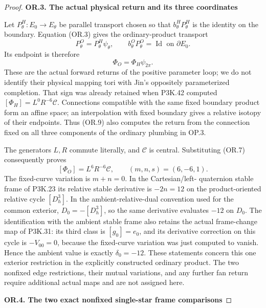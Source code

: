 \begin{proof}
\par

\medskip\noindent\textbf{OR.3. The actual physical return and its three coordinates}

\par\nobreak

Let \(P^H_\theta:E_0\to E_\theta\) be parallel transport chosen
so that \(b^H_\theta P^H_\theta\) is the identity on the boundary.
Equation (OR.3) gives the ordinary-product transport
\[
                       P^O_\theta=P^H_\theta\psi_\theta,
 \qquad b^O_\theta P^O_\theta=\operatorname{Id}
                       \text{ on }\partial E_0.      \tag{OR.8}
\]
Its endpoint is therefore
\[
                         \Phi_O=\Phi_H\psi_{2\pi}.   \tag{OR.9}
\]
These are the actual forward returns of the positive parameter loop;
we do not identify their physical mapping tori with Jin's oppositely
parameterized completion. That sign was already retained when
P3K.42 computed \([\Phi_H]=L^0R^{-6}\mathcal C\).
Connections compatible with the same fixed boundary product form
an affine space; an interpolation with fixed boundary gives a
relative isotopy of their endpoints. Thus (OR.9) also computes the
return from the connection fixed on all three components of the
ordinary plumbing in OP.3.

The generators \(L,R\) commute literally, and \(\mathcal C\) is
central. Substituting (OR.7) consequently proves
\[
       [\Phi_O]=L^6R^{-6}\mathcal C,
       \qquad (m,n,s)=(6,-6,1).                      \tag{OR.10}
\]
The fixed-curve variation is \(m+n=0\). In the Cartesian/left-
quaternion stable frame of P3K.23 its relative stable derivative is
\(-2n=12\) on the product-oriented relative cycle \([D^3_h]\).
In the ambient-relative-dual convention used for the common exterior,
\(D_0=-[D^3_h]\), so the same derivative evaluates \(-12\) on
\(D_0\). The identification with the ambient stable frame also retains the
actual frame-change map of P3K.31: its third class is
\([g_0]=e_0\), and its derivative correction on this cycle is
\(-V_{00}=0\), because the fixed-curve variation was just
computed to vanish. Hence the ambient value is exactly
\(\delta_0=-12\). These statements concern this one exterior restriction
in the explicitly constructed ordinary product. The two nonfixed
edge restrictions, their mutual variations, and any further fan
return require additional actual maps and are not assigned here.

\par

\medskip\noindent\textbf{OR.4. The two exact nonfixed single-star frame comparisons}


\end{proof}
